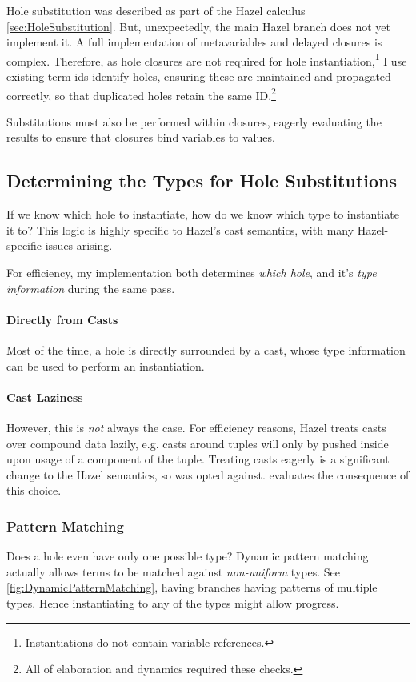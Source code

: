 Hole substitution was described as part of the Hazel calculus \cref{sec:HoleSubstitution}. But, unexpectedly, the main Hazel branch does not yet implement it. A full implementation of metavariables and delayed closures is complex. Therefore, as hole closures are not required for hole instantiation,\footnote{Instantiations do not contain variable references.} I use existing term ids identify holes, ensuring these are maintained and propagated correctly, so that duplicated holes retain the same ID.\footnote{All of elaboration and dynamics required these checks.}

Substitutions must also be performed within closures, eagerly evaluating the results to ensure that closures bind variables to values. 

\subsection{Determining the Types for Hole Substitutions}
\label{sec:TypesForHoles}
If we know which hole to instantiate, how do we know which type to instantiate it to? This logic is highly specific to Hazel's cast semantics, with many Hazel-specific issues arising.

For efficiency, my implementation both determines \textit{which hole}, and it's \textit{type information} during the same pass.

\paragraph{Directly from Casts}
Most of the time, a hole is directly surrounded by a cast, whose type information can be used to perform an instantiation.

\paragraph{Cast Laziness}\label{sec:CastLaziness}
However, this is \textit{not} always the case. For efficiency reasons, Hazel treats casts over compound data lazily, e.g. casts around tuples will only by pushed inside upon usage of a component of the tuple. Treating casts eagerly is a significant change to the Hazel semantics, so was opted against.  evaluates the consequence of this choice. 


\subsubsection{Pattern Matching}
\label{sec:PatternMatching}
Does a hole even have only one possible type? Dynamic pattern matching actually allows terms to be matched against \textit{non-uniform} types. See \cref{fig:DynamicPatternMatching}, having branches having patterns of multiple types. Hence instantiating to any of the types might allow progress.

